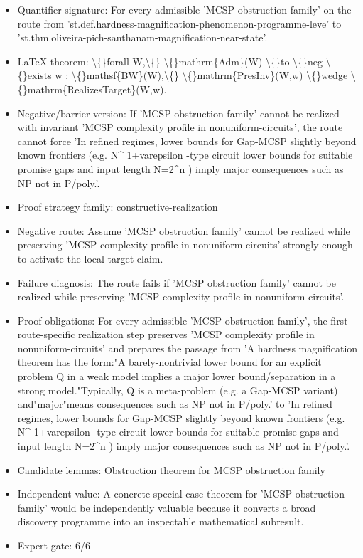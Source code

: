 \documentclass[11pt]{article}
\begin{document}
\begin{itemize}
\item Quantifier signature: For every admissible 'MCSP obstruction family' on the route from 'st.def.hardness-magnification-phenomenon-programme-leve' to 'st.thm.oliveira-pich-santhanam-magnification-near-state'.
\item LaTeX theorem: \textbackslash\{\}forall W,\textbackslash\{\} \textbackslash\{\}mathrm\{Adm\}(W) \textbackslash\{\}to \textbackslash\{\}neg \textbackslash\{\}exists w : \textbackslash\{\}mathsf\{BW\}(W),\textbackslash\{\} \textbackslash\{\}mathrm\{PresInv\}(W,w) \textbackslash\{\}wedge \textbackslash\{\}mathrm\{RealizesTarget\}(W,w).
\item Negative/barrier version: If 'MCSP obstruction family' cannot be realized with invariant 'MCSP complexity profile in nonuniform-circuits', the route cannot force 'In refined regimes, lower bounds for Gap-MCSP slightly beyond known frontiers (e.g. N\textasciicircum{} 1+varepsilon -type circuit lower bounds for suitable promise gaps and input length N=2\textasciicircum{}n ) imply major consequences such as NP not in P/poly.'.
\item Proof strategy family: constructive-realization
\item Negative route: Assume 'MCSP obstruction family' cannot be realized while preserving 'MCSP complexity profile in nonuniform-circuits' strongly enough to activate the local target claim.
\item Failure diagnosis: The route fails if 'MCSP obstruction family' cannot be realized while preserving 'MCSP complexity profile in nonuniform-circuits'.
\item Proof obligations: For every admissible 'MCSP obstruction family', the first route-specific realization step preserves 'MCSP complexity profile in nonuniform-circuits' and prepares the passage from 'A hardness magnification theorem has the form:"A barely-nontrivial lower bound for an explicit problem Q in a weak model implies a major lower bound/separation in a strong model."Typically, Q is a meta-problem (e.g. a Gap-MCSP variant) and"major"means consequences such as NP not in P/poly.' to 'In refined regimes, lower bounds for Gap-MCSP slightly beyond known frontiers (e.g. N\textasciicircum{} 1+varepsilon -type circuit lower bounds for suitable promise gaps and input length N=2\textasciicircum{}n ) imply major consequences such as NP not in P/poly.'.
\item Candidate lemmas: Obstruction theorem for MCSP obstruction family
\item Independent value: A concrete special-case theorem for 'MCSP obstruction family' would be independently valuable because it converts a broad discovery programme into an inspectable mathematical subresult.
\item Expert gate: 6/6
\end{itemize}
\end{document}
